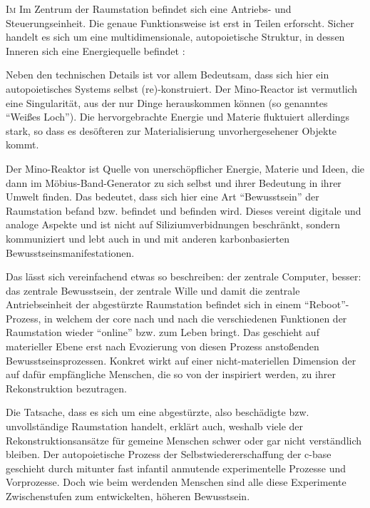 \begin{newstuff}
    \lettrine{I}{m}
    Im Zentrum der Raumstation befindet sich eine Antriebs- und Steuerungseinheit. Die genaue Funktionsweise ist erst in Teilen erforscht. Sicher handelt es sich um eine multidimensionale, autopoietische Struktur, in dessen Inneren sich eine Energiequelle befindet \cite[S. 31]{cbasebook}:


    Neben den technischen Details ist vor allem Bedeutsam, dass sich hier ein autopoietisches Systems selbst (re)-konstruiert. 
    Der Mino-Reactor ist vermutlich eine Singularität, aus der nur Dinge herauskommen können (so genanntes "`Weißes Loch"'). Die hervorgebrachte Energie und Materie fluktuiert allerdings stark, so dass es desöfteren zur Materialisierung unvorhergesehener Objekte kommt.

    Der Mino-Reaktor  ist Quelle von unerschöpflicher Energie, Materie und Ideen, die dann im Möbius-Band-Generator zu sich selbst und ihrer Bedeutung in ihrer Umwelt finden.
    Das bedeutet, dass sich hier eine Art "`Bewusstsein"' der Raumstation befand bzw. befindet und befinden wird. 
    Dieses vereint digitale und analoge Aspekte und ist nicht auf Siliziumverbidnungen beschränkt, sondern kommuniziert und lebt auch in und mit anderen karbonbasierten Bewusstseinsmanifestationen. 

    Das lässt sich vereinfachend etwas so beschreiben: der zentrale Computer, besser: das zentrale Bewusstsein, der zentrale Wille und damit die zentrale Antriebseinheit der abgestürzte Raumstation befindet sich in einem "`Reboot"'-Prozess, in welchem der {core} nach und nach die verschiedenen Funktionen der Raumstation wieder "`online"' bzw. zum Leben bringt. Das geschieht auf materieller Ebene erst nach Evozierung von diesen Prozess anstoßenden  Bewusstseinsprozessen. Konkret wirkt auf einer nicht-materiellen Dimension der  auf dafür empfängliche Menschen, die so von der  inspiriert werden, zu ihrer Rekonstruktion bezutragen. 

    Die Tatsache, dass es sich um eine abgestürzte, also beschädigte bzw. unvollständige Raumstation handelt, erklärt auch, weshalb viele der Rekonstruktionsansätze für gemeine Menschen schwer oder gar nicht verständlich bleiben. Der autopoietische Prozess der Selbstwiedererschaffung der c-base geschieht durch mitunter fast infantil anmutende experimentelle Prozesse und Vorprozesse. Doch wie beim werdenden Menschen sind alle diese Experimente Zwischenstufen zum entwickelten, höheren Bewusstsein.  


\end{newstuff}
